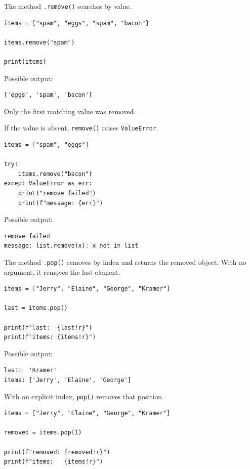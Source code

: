 The method \texttt{.remove()} searches by value.

\begin{verbatim}
items = ["spam", "eggs", "spam", "bacon"]

items.remove("spam")

print(items)
\end{verbatim}

Possible output:

\begin{verbatim}
['eggs', 'spam', 'bacon']
\end{verbatim}

Only the first matching value was removed.

If the value is absent, \texttt{remove()} raises \texttt{ValueError}.

\begin{verbatim}
items = ["spam", "eggs"]

try:
    items.remove("bacon")
except ValueError as err:
    print("remove failed")
    print(f"message: {err}")
\end{verbatim}

Possible output:

\begin{verbatim}
remove failed
message: list.remove(x): x not in list
\end{verbatim}

The method \texttt{.pop()} removes by index and returns the removed object. With no argument, it removes the last element.

\begin{verbatim}
items = ["Jerry", "Elaine", "George", "Kramer"]

last = items.pop()

print(f"last:  {last!r}")
print(f"items: {items!r}")
\end{verbatim}

Possible output:

\begin{verbatim}
last:  'Kramer'
items: ['Jerry', 'Elaine', 'George']
\end{verbatim}

With an explicit index, \texttt{pop()} removes that position.

\begin{verbatim}
items = ["Jerry", "Elaine", "George", "Kramer"]

removed = items.pop(1)

print(f"removed: {removed!r}")
print(f"items:   {items!r}")
\end{verbatim}

